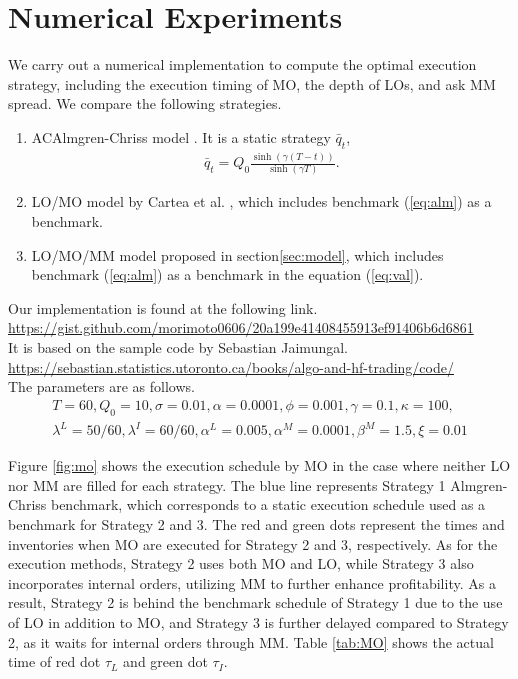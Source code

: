 \documentclass[12pt]{article}
\begin{document}
\section{Numerical Experiments}
We carry out a numerical implementation to compute the optimal execution strategy,
including the execution timing of MO, the depth of LOs, and ask MM spread.  
We compare the following strategies.
\begin{enumerate}
  \item ACAlmgren-Chriss model \cite{almgren2001optimal}. It is a static strategy $\bar{q}_t$, 
  \begin{align}
    \bar{q}_t = Q_0\frac{\sinh(\gamma (T-t))}{\sinh(\gamma T)}.\label{eq:alm}
  \end{align}
  \item LO/MO model by Cartea et al. \cite{cartea2015algorithmic}, which includes benchmark (\ref{eq:alm}) as a benchmark.
  \item LO/MO/MM model proposed in section\ref{sec:model}, which includes benchmark (\ref{eq:alm}) as a benchmark in the equation (\ref{eq:val}).
\end{enumerate}
Our implementation is found at the following link.\\
\url{https://gist.github.com/morimoto0606/20a199e41408455913ef91406b6d6861}\\
It is based on the sample code by Sebastian Jaimungal.\\
\url{https://sebastian.statistics.utoronto.ca/books/algo-and-hf-trading/code/}\\
The parameters are as follows.
\begin{align*}
T = 60, Q_0 = 10, \sigma = 0.01,  \alpha = 0.0001, \phi = 0.001,  \gamma = 0.1,
\kappa = 100, \\ \lambda^L = 50/60, \lambda^I = 60/60, \alpha^L = 0.005, \alpha^M = 0.0001, \beta^M = 1.5, \xi = 0.01
\end{align*}

Figure \ref{fig:mo} shows the execution schedule by MO in the case where neither LO nor MM are filled for each strategy. 
The blue line represents Strategy 1 Almgren-Chriss benchmark, which corresponds to a static execution schedule used as a benchmark for Strategy 2 and 3.
The red and green dots represent the times and inventories when MO are executed for Strategy 2 and 3, respectively. 
As for the execution methods, Strategy 2 uses both MO and LO, while Strategy 3 also incorporates internal orders, utilizing MM to further enhance profitability. 
As a result, Strategy 2 is behind the benchmark schedule of Strategy 1 due to the use of LO in addition to MO, and Strategy 3 is further delayed compared to Strategy 2, 
as it waits for internal orders through MM.
Table \ref{tab:MO} shows the actual time of red dot $\tau_L$ and green dot $\tau_I$.
\end{document}
